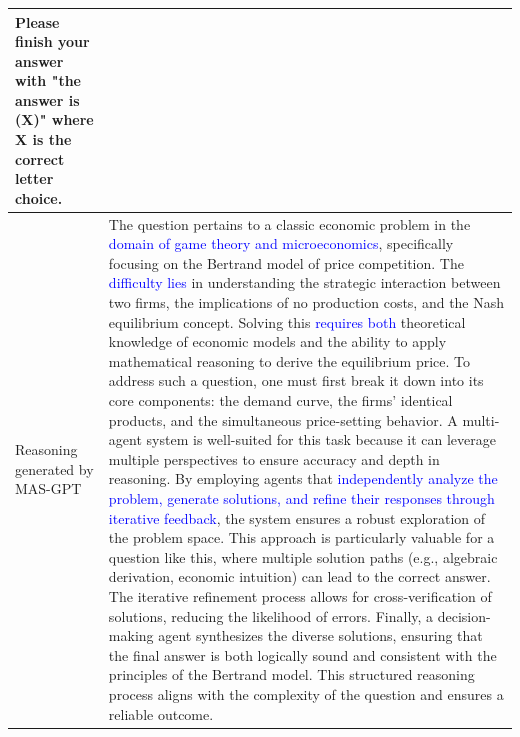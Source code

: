 \documentclass{article}
\theoremstyle{plain}
\theoremstyle{definition}
\theoremstyle{remark}
\begin{document}
\begin{table}[h!]
\begin{tabular}{p{1.8cm}|p{14cm}}
Please finish your answer with "the answer is (X)" where X is the correct letter choice. \\
    \midrule
        Reasoning generated by MAS-GPT & The question pertains to a classic economic problem in the \textcolor{blue}{domain of game theory and microeconomics}, specifically focusing on the Bertrand model of price competition. The \textcolor{blue}{difficulty lies} in understanding the strategic interaction between two firms, the implications of no production costs, and the Nash equilibrium concept. Solving this \textcolor{blue}{requires both} theoretical knowledge of economic models and the ability to apply mathematical reasoning to derive the equilibrium price. \newline\newline To address such a question, one must first break it down into its core components: the demand curve, the firms' identical products, and the simultaneous price-setting behavior. \newline\newline A multi-agent system is well-suited for this task because it can leverage multiple perspectives to ensure accuracy and depth in reasoning. By employing agents that \textcolor{blue}{independently analyze the problem, generate solutions, and refine their responses through iterative feedback}, the system ensures a robust exploration of the problem space. This approach is particularly valuable for a question like this, where multiple solution paths (e.g., algebraic derivation, economic intuition) can lead to the correct answer. The iterative refinement process allows for cross-verification of solutions, reducing the likelihood of errors. Finally, a decision-making agent synthesizes the diverse solutions, ensuring that the final answer is both logically sound and consistent with the principles of the Bertrand model. This structured reasoning process aligns with the complexity of the question and ensures a reliable outcome.
\\
    \bottomrule
    \end{tabular}
    \label{tab:case3_novel}
\end{table}
\end{document}
